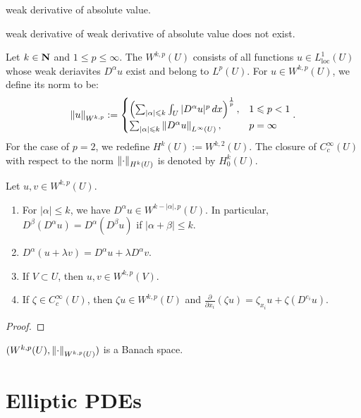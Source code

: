 {\color{red}\begin{example}
	weak derivative of absolute value.
\end{example}}

{\color{red} \begin{example}
weak derivative of weak derivative of absolute value does not exist.	
\end{example}}

\begin{definition}
	Let $k \in \mathbf{N}$ and $1 \leq p \leq \infty$. The  $W^{k,p}(U)$ consists of all functions $u \in L_{\text{loc}}^1(U)$ whose weak deriavites $D^\alpha u$ exist and belong to $L^p(U)$. For $u \in W^{k,p}(U)$, we define its norm to be:
	\begin{align*}
		\left\lVert u \right\rVert_{W^{k,p}} := 
		\begin{cases}
			\left( \sum_{|\alpha| \leqslant k}^{} \int_{U}^{} |D^\alpha u|^p \,dx \right)^{\frac{1}{p}}, & 1 \leqslant p < 1 \\
			\sum_{|\alpha| \leqslant k}^{} \left\lVert D^\alpha u \right\rVert_{L^\infty(U)}, & p = \infty
		\end{cases}.
	\end{align*}
	For the case of $p = 2$, we redefine $H^k(U) := W^{k,2}(U)$. The closure of $C_c^\infty(U)$ with respect to the norm $\left\lVert \cdot \right\rVert_{H^k(U)}$ is denoted by $H_0^k(U)$.
\end{definition}

\begin{theorem}
	Let $u,v \in W^{k,p}(U)$.
	\mbox{}
	\begin{enumerate}[label = (\alph*),itemsep=1pt,topsep=3pt]
		\item For $|\alpha| \leq k$, we have $D^\alpha u \in W^{k - |\alpha|,p}(U)$. In particular, $D^\beta(D^\alpha u ) = D^\alpha(D^\beta u )$ if $|\alpha + \beta| \leq k$.
		\item $D^\alpha(u + \lambda v) = D^\alpha u + \lambda D^\alpha v$.
		\item If $V \subset U$, then $u,v \in W^{k,p}(V)$.
		\item If $\zeta \in C_c^\infty(U)$, then $\zeta u \in W^{k,p}(U)$ and $\frac{\partial}{\partial x_i}(\zeta u ) = \zeta_{x_i}u + \zeta (D^{e_i}u)$.
	\end{enumerate}
\end{theorem}
{\color{red}
\begin{proof}
		
\end{proof}}

\begin{theorem}
	$(W^{k,p}(U),\left\lVert \cdot \right\rVert_{W^{k,p}(U)})$ is a Banach space.
\end{theorem}




\section{Elliptic PDEs}
